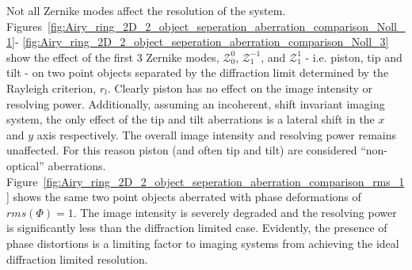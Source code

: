 Not all Zernike modes affect the resolution of the system. 
Figures~\ref{fig:Airy_ring_2D_2_object_seperation_aberration_comparison_Noll_1}-
\ref{fig:Airy_ring_2D_2_object_seperation_aberration_comparison_Noll_3}
show the effect of the first 3 Zernike modes, $\mathcal{Z}_{0}^{0}$, 
$\mathcal{Z}_{1}^{-1}$, and $\mathcal{Z}_{1}^{1}$ - i.e. piston, tip and 
tilt - on two point objects separated by the diffraction limit determined
by the Rayleigh criterion, $r_{l}$. Clearly piston has no effect on the 
image intensity or resolving power. Additionally, assuming an incoherent, 
shift invariant imaging system, the only effect of the tip and tilt 
aberrations is a lateral shift in the $x$ and $y$ axis respectively. The
overall image intensity and resolving power remains unaffected. For this 
reason piston (and often tip and tilt) are considered ``non-optical'' 
aberrations. 
Figure~\ref{fig:Airy_ring_2D_2_object_seperation_aberration_comparison_rms_1}
shows the same two point objects aberrated with phase deformations of 
$rms(\Phi) = 1$. The image intensity is severely degraded and the resolving
power is significantly less than the diffraction limited case. Evidently, 
the presence of phase distortions is a limiting factor to imaging systems 
from achieving the ideal diffraction limited 
resolution\cite{antonello2014optimisation,booth2014adaptive}.

